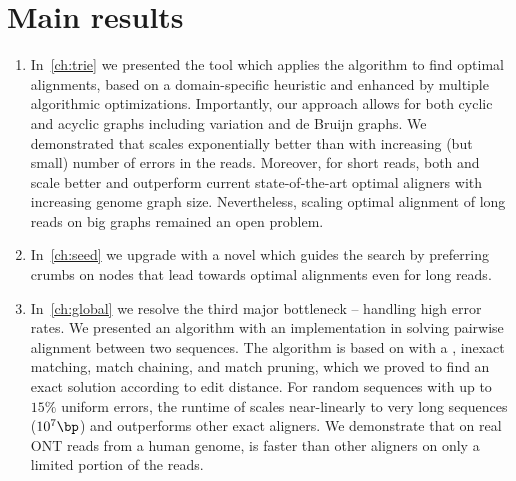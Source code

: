 \section{Main results}

\begin{enumerate}
	\item In~\cref{ch:trie} we presented the tool \astarix which applies the \A
algorithm to find optimal alignments, based on a domain-specific heuristic and
enhanced by multiple algorithmic optimizations. Importantly, our approach allows
for both cyclic and acyclic graphs including variation and de Bruijn graphs. We
demonstrated that \astarix scales exponentially better than \dijkstra with
increasing (but small) number of errors in the reads. Moreover, for short reads,
both \astarix and \dijkstra scale better and outperform current state-of-the-art
optimal aligners with increasing genome graph size. Nevertheless, scaling
optimal alignment of long reads on big graphs remained an open problem.
	\item In~\cref{ch:seed} we upgrade \astarix with a novel \seedh which guides
the search by preferring crumbs on nodes that lead towards optimal alignments
even for long reads.
	\item In~\cref{ch:global} we resolve the third major bottleneck -- handling
high error rates. We presented an algorithm with an implementation in \astarpa
solving pairwise alignment between two sequences. The algorithm is based on \A
with a \sh, inexact matching, match chaining, and match pruning, which we proved
to find an exact solution according to edit distance. For random sequences with
up to $15\%$ uniform errors, the runtime of \astarpa scales near-linearly to
very long sequences ($10^7\bp$) and outperforms other exact aligners. We
demonstrate that on real ONT reads from a human genome, \astarpa is faster than
other aligners on only a limited portion of the reads.
\end{enumerate}
